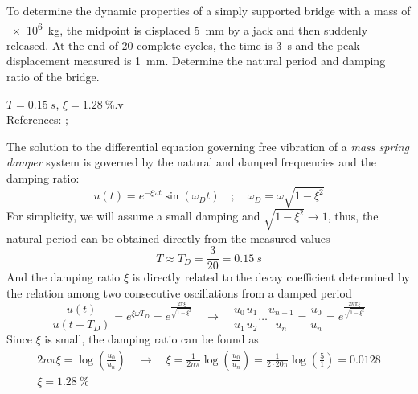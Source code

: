
\begin{Exercise}[label={free_vibration}]
To determine the dynamic properties of a simply supported bridge with a mass of \SI{e6}{kg}, the midpoint is displaced \SI{5}{mm} by a jack and then suddenly released. At the end of 20 complete cycles, the time is \SI{3}{s} and the peak displacement measured is \SI{1}{mm}. Determine the natural period and damping ratio of the bridge.

\begin{center}
\end{center}

\shortAnswer $T=\SI{0.15}{s}$, $\xi=\SI{1.28}{\%}$.v \\
References: \cite[p. 49]{chopra}; \cite[p. 287]{blanco}
\end{Exercise}



\begin{Answer}[ref={free_vibration}]
The solution to the differential equation governing free vibration of a \emph{mass spring damper} system is governed by the natural and damped frequencies and the damping ratio:
$$
u(t) = e^{-\xi\omega t}\sin(\omega_D t) \quad ; \quad \omega_D = \omega\sqrt{1-\xi^2}
$$
For simplicity, we will assume a small damping and $\sqrt{1-\xi^2}\rightarrow1$, thus, the natural period can be obtained directly from the measured values
$$
T \approx T_D = \frac{3}{20} = \SI{0.15}{s}
$$
And the damping ratio $\xi$ is directly related to the decay coefficient determined by the relation among two consecutive oscillations from a damped period
$$
\frac{u(t)}{u(t+T_D)} = e^{\xi\omega T_D} = e^{\frac{2\pi\xi}{\sqrt{1-\xi^2}}} \quad \rightarrow \quad
\frac{u_0}{u_1} \frac{u_1}{u_2} \dots \frac{u_{n-1}}{u_n} = \frac{u_0}{u_n} = e^{\frac{2n\pi\xi}{\sqrt{1-\xi^2}}}
$$
Since $\xi$ is small, the damping ratio can be found as
\begin{align*}
2n\pi\xi = \log\left(\frac{u_0}{u_n}\right) \quad \rightarrow \quad
\xi = \frac{1}{2n\pi} \log\left(\frac{u_0}{u_n}\right) = \frac{1}{2\cdot20\pi} \log\left(\frac{5}{1}\right) = 0.0128 \\
\xi = \SI{1.28}{\%}
\end{align*}    

\end{Answer}